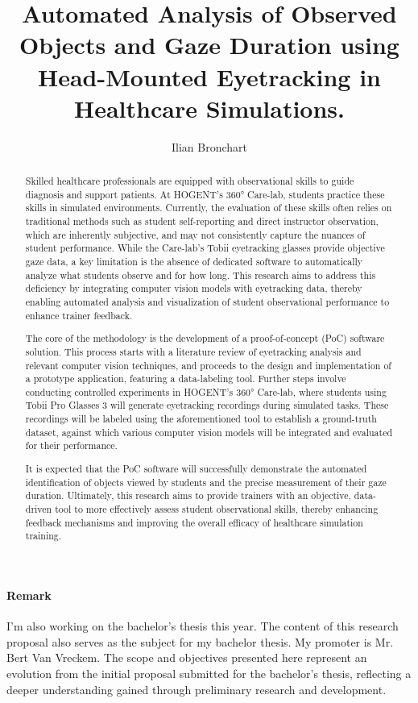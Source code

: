 \documentclass[english]{hogent-article}
\title{Automated Analysis of Observed Objects and Gaze Duration using Head-Mounted Eyetracking in Healthcare Simulations.}
\author{Ilian Bronchart}
\begin{document}
\begin{abstract}
Skilled healthcare professionals are equipped with observational skills to guide diagnosis and support patients.
At HOGENT's 360° Care-lab, students practice these skills in simulated environments.
Currently, the evaluation of these skills often relies on traditional methods such as student 
self-reporting and direct instructor observation, which are inherently subjective, and may not 
consistently capture the nuances of student performance. 
While the Care-lab's Tobii eyetracking glasses provide objective gaze data, a key limitation is the absence 
of dedicated software to automatically analyze what students observe and for how long.
This research aims to address this deficiency by integrating computer vision models with eyetracking data, 
thereby enabling automated analysis and visualization of student observational performance to enhance trainer feedback.

The core of the methodology is the development of a proof-of-concept (PoC) software solution. 
This process starts with a literature review of eyetracking analysis and relevant computer vision techniques, 
and proceeds to the design and implementation of a prototype application, featuring a data-labeling tool. 
Further steps involve conducting controlled experiments in HOGENT's 360° Care-lab, 
where students using Tobii Pro Glasses 3 will generate eyetracking recordings during simulated tasks. 
These recordings will be labeled using the aforementioned tool to establish a ground-truth dataset, 
against which various computer vision models will be integrated and evaluated for their 
performance.

It is expected that the PoC software will successfully demonstrate the automated identification 
of objects viewed by students and the precise measurement of their gaze duration. 
Ultimately, this research aims to provide trainers with an objective, data-driven tool to more effectively assess 
student observational skills, thereby enhancing feedback mechanisms and improving the overall efficacy of healthcare simulation training.
\end{abstract}

\tableofcontents

\bigskip

\paragraph{Remark}

I'm also working on the bachelor's thesis this year. The content of this research proposal also serves as the subject for my bachelor thesis. 
My promoter is Mr. Bert Van Vreckem. The scope and objectives presented here represent an evolution from the initial proposal submitted 
for the bachelor's thesis, reflecting a deeper understanding gained through preliminary research and development.
\end{document}
